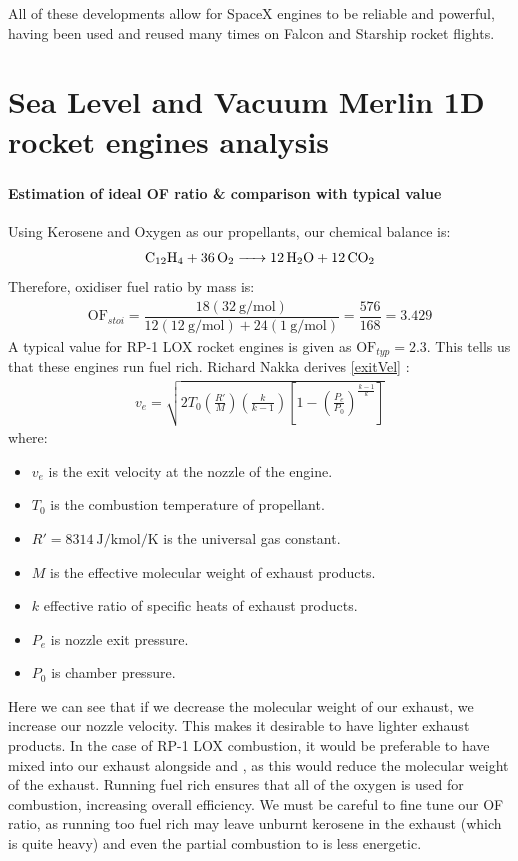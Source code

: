 \documentclass[11pt]{article}
\numberwithin{equation}{section}
\begin{document}
All of these developments allow for SpaceX engines to be reliable and powerful, having been used and reused many times on Falcon and Starship rocket flights.
\part{Sea Level and Vacuum Merlin 1D rocket engines analysis}
\section{}
\subsection{Estimation of ideal OF ratio \& comparison with typical value}
Using Kerosene and Oxygen as our propellants, our chemical balance is:
\begin{equation}
    \ce{C12H4 + 36O2 -> 12H2O + 12CO2}
\end{equation}
Therefore, oxidiser fuel ratio by mass is:
\begin{gather}
    \textrm{OF}_{stoi} = \dfrac{18 (\SI{32}{\gram\per\mol})}{12(\SI{12}{\gram\per\mol}) + 24(\SI{1}{\gram\per\mol})} = \dfrac{576}{168} = 3.429
\end{gather}
A typical value for RP-1 LOX rocket engines is given as $\textrm{OF}_{typ} = 2.3$. This tells us that these engines run fuel rich. Richard Nakka derives \ref{exitVel} \cite{b8}:
\begin{gather}
    v_e = \sqrt{2 T_0 \left(\frac{R'}{M}\right)\left(\frac{k}{k-1}\right)\left[1 - \left(\frac{P_e}{P_0}\right)^{\frac{k-1}{k}}\right]} \label{exitVel}
\end{gather}
where:
\begin{itemize}
    \item $v_e$ is the exit velocity at the nozzle of the engine.
    \item $T_0$ is the combustion temperature of propellant.
    \item $R' = \SI{8314}{\joule\per\kilo\mol\per\kelvin}$ is the universal gas constant.
    \item $M$ is the effective molecular weight of exhaust products.
    \item $k$ effective ratio of specific heats of exhaust products.
    \item $P_e$ is nozzle exit pressure.
    \item $P_0$ is chamber pressure.
\end{itemize}
Here we can see that if we decrease the molecular weight of our exhaust, we increase our nozzle velocity. This makes it desirable to have lighter exhaust products. In the case of RP-1 LOX combustion, it would be preferable to have  mixed into our exhaust alongside  and , as this would reduce the molecular weight of the exhaust. Running fuel rich ensures that all of the oxygen is used for combustion, increasing overall efficiency. We must be careful to fine tune our OF ratio, as running too fuel rich may leave unburnt kerosene in the exhaust (which is quite heavy) and even the partial combustion to  is less energetic.
\end{document}
